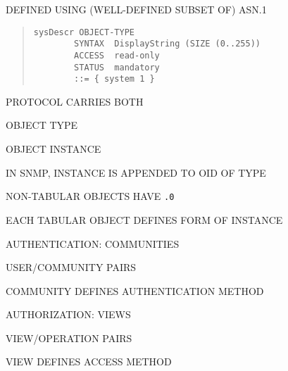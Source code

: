 \begin{bwslide}

\begin{nrtc}
\item	DEFINED USING (WELL-DEFINED SUBSET OF) ASN.1
\begin{quote}\small\begin{verbatim}
sysDescr OBJECT-TYPE
        SYNTAX  DisplayString (SIZE (0..255))
        ACCESS  read-only
        STATUS  mandatory
        ::= { system 1 }
\end{verbatim}\end{quote}

\item	PROTOCOL CARRIES BOTH
    \begin{nrtc}
    \item	 OBJECT TYPE

    \item	 OBJECT INSTANCE
    \end{nrtc}

\item	IN SNMP, INSTANCE IS APPENDED TO OID OF TYPE
    \begin{nrtc}
    \item	NON-TABULAR OBJECTS HAVE \verb".0"

    \item	EACH TABULAR OBJECT DEFINES FORM OF INSTANCE
    \end{nrtc}
\end{nrtc}
\end{bwslide}






\begin{bwslide}

\begin{nrtc}
\item	AUTHENTICATION: COMMUNITIES
    \begin{nrtc}
    \item	USER/COMMUNITY PAIRS
    \end{nrtc}
    COMMUNITY DEFINES AUTHENTICATION METHOD

\item	AUTHORIZATION: VIEWS
    \begin{nrtc}
    \item	VIEW/OPERATION PAIRS
    \end{nrtc}
    VIEW DEFINES ACCESS METHOD
\end{nrtc}
\end{bwslide}


